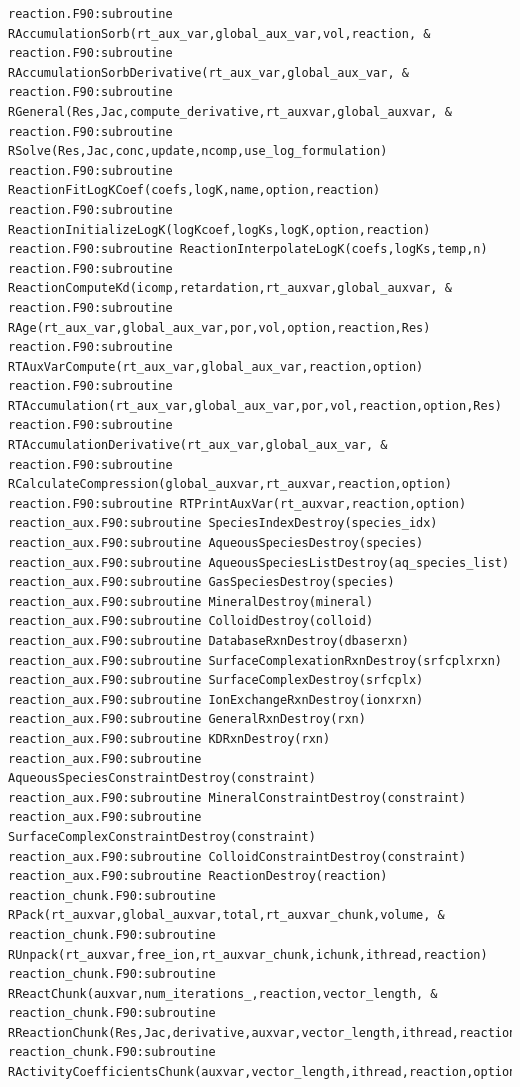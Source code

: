 \documentclass[12pt]{article}
\begin{document}
\begin{verbatim}
reaction.F90:subroutine RAccumulationSorb(rt_aux_var,global_aux_var,vol,reaction, &
reaction.F90:subroutine RAccumulationSorbDerivative(rt_aux_var,global_aux_var, &
reaction.F90:subroutine RGeneral(Res,Jac,compute_derivative,rt_auxvar,global_auxvar, &
reaction.F90:subroutine RSolve(Res,Jac,conc,update,ncomp,use_log_formulation)
reaction.F90:subroutine ReactionFitLogKCoef(coefs,logK,name,option,reaction)
reaction.F90:subroutine ReactionInitializeLogK(logKcoef,logKs,logK,option,reaction)
reaction.F90:subroutine ReactionInterpolateLogK(coefs,logKs,temp,n)
reaction.F90:subroutine ReactionComputeKd(icomp,retardation,rt_auxvar,global_auxvar, &
reaction.F90:subroutine RAge(rt_aux_var,global_aux_var,por,vol,option,reaction,Res)
reaction.F90:subroutine RTAuxVarCompute(rt_aux_var,global_aux_var,reaction,option)
reaction.F90:subroutine RTAccumulation(rt_aux_var,global_aux_var,por,vol,reaction,option,Res)
reaction.F90:subroutine RTAccumulationDerivative(rt_aux_var,global_aux_var, &
reaction.F90:subroutine RCalculateCompression(global_auxvar,rt_auxvar,reaction,option)
reaction.F90:subroutine RTPrintAuxVar(rt_auxvar,reaction,option)
reaction_aux.F90:subroutine SpeciesIndexDestroy(species_idx)
reaction_aux.F90:subroutine AqueousSpeciesDestroy(species)
reaction_aux.F90:subroutine AqueousSpeciesListDestroy(aq_species_list)
reaction_aux.F90:subroutine GasSpeciesDestroy(species)
reaction_aux.F90:subroutine MineralDestroy(mineral)
reaction_aux.F90:subroutine ColloidDestroy(colloid)
reaction_aux.F90:subroutine DatabaseRxnDestroy(dbaserxn)
reaction_aux.F90:subroutine SurfaceComplexationRxnDestroy(srfcplxrxn)
reaction_aux.F90:subroutine SurfaceComplexDestroy(srfcplx)
reaction_aux.F90:subroutine IonExchangeRxnDestroy(ionxrxn)
reaction_aux.F90:subroutine GeneralRxnDestroy(rxn)
reaction_aux.F90:subroutine KDRxnDestroy(rxn)
reaction_aux.F90:subroutine AqueousSpeciesConstraintDestroy(constraint)
reaction_aux.F90:subroutine MineralConstraintDestroy(constraint)
reaction_aux.F90:subroutine SurfaceComplexConstraintDestroy(constraint)
reaction_aux.F90:subroutine ColloidConstraintDestroy(constraint)
reaction_aux.F90:subroutine ReactionDestroy(reaction)
reaction_chunk.F90:subroutine RPack(rt_auxvar,global_auxvar,total,rt_auxvar_chunk,volume, &
reaction_chunk.F90:subroutine RUnpack(rt_auxvar,free_ion,rt_auxvar_chunk,ichunk,ithread,reaction)
reaction_chunk.F90:subroutine RReactChunk(auxvar,num_iterations_,reaction,vector_length, &
reaction_chunk.F90:subroutine RReactionChunk(Res,Jac,derivative,auxvar,vector_length,ithread,reaction,option)
reaction_chunk.F90:subroutine RActivityCoefficientsChunk(auxvar,vector_length,ithread,reaction,option)

\end{verbatim}
\end{document}
